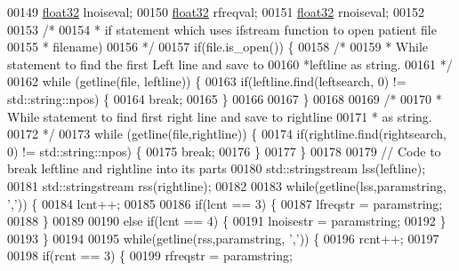 \begin{DoxyCode}
00149         \hyperlink{definitions_8hpp_aacdc525d6f7bddb3ae95d5c311bd06a1}{float32} lnoiseval;
00150         \hyperlink{definitions_8hpp_aacdc525d6f7bddb3ae95d5c311bd06a1}{float32} rfreqval;
00151         \hyperlink{definitions_8hpp_aacdc525d6f7bddb3ae95d5c311bd06a1}{float32} rnoiseval;
00152 
00153         \textcolor{comment}{/*}
00154 \textcolor{comment}{         * if statement which uses ifstream function to open patient file }
00155 \textcolor{comment}{         * filename)}
00156 \textcolor{comment}{         */}
00157         \textcolor{keywordflow}{if}(file.is\_open()) \{
00158             \textcolor{comment}{/*}
00159 \textcolor{comment}{             * While statement to find the first Left line and save to }
00160 \textcolor{comment}{             *leftline as string.}
00161 \textcolor{comment}{             */}
00162             \textcolor{keywordflow}{while} (getline(file, leftline)) \{
00163                 \textcolor{keywordflow}{if}(leftline.find(leftsearch, 0) != std::string::npos) \{
00164                     \textcolor{keywordflow}{break};
00165                 \}
00166 
00167             \}
00168 
00169             \textcolor{comment}{/*}
00170 \textcolor{comment}{             * While statement to find first right line and save to rightline}
00171 \textcolor{comment}{             * as string.}
00172 \textcolor{comment}{             */}
00173             \textcolor{keywordflow}{while} (getline(file,rightline)) \{
00174                 \textcolor{keywordflow}{if}(rightline.find(rightsearch, 0) != std::string::npos) \{
00175                     \textcolor{keywordflow}{break};
00176                 \}
00177             \}
00178 
00179             \textcolor{comment}{// Code to break leftline and rightline into its parts}
00180             std::stringstream lss(leftline);
00181             std::stringstream rss(rightline);
00182 
00183             \textcolor{keywordflow}{while}(getline(lss,paramstring, \textcolor{charliteral}{','})) \{
00184                 lcnt++;
00185 
00186                 \textcolor{keywordflow}{if}(lcnt == 3) \{
00187                     lfreqstr = paramstring;
00188                 \}
00189 
00190                 \textcolor{keywordflow}{else} \textcolor{keywordflow}{if}(lcnt == 4) \{
00191                     lnoisestr = paramstring;
00192                 \}
00193             \}
00194 
00195             \textcolor{keywordflow}{while}(getline(rss,paramstring, \textcolor{charliteral}{','})) \{
00196                 rcnt++;
00197 
00198                 \textcolor{keywordflow}{if}(rcnt == 3) \{
00199                     rfreqstr = paramstring;

\end{DoxyCode}
